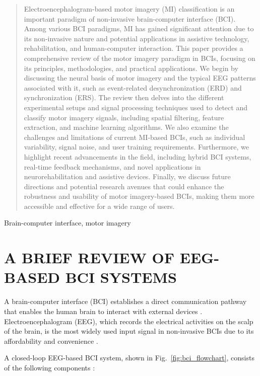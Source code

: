 \documentclass[journal,twocolumn]{IEEEtran}
\begin{document}
\begin{abstract}
Electroencephalogram-based motor imagery (MI) classification is an important paradigm of non-invasive brain-computer interface (BCI). Among various BCI paradigms, MI has gained significant attention due to its non-invasive nature and potential applications in assistive technology, rehabilitation, and human-computer interaction. This paper provides a comprehensive review of the motor imagery paradigm in BCIs, focusing on its principles, methodologies, and practical applications. We begin by discussing the neural basis of motor imagery and the typical EEG patterns associated with it, such as event-related desynchronization (ERD) and synchronization (ERS). The review then delves into the different experimental setups and signal processing techniques used to detect and classify motor imagery signals, including spatial filtering, feature extraction, and machine learning algorithms. We also examine the challenges and limitations of current MI-based BCIs, such as individual variability, signal noise, and user training requirements. Furthermore, we highlight recent advancements in the field, including hybrid BCI systems, real-time feedback mechanisms, and novel applications in neurorehabilitation and assistive devices. Finally, we discuss future directions and potential research avenues that could enhance the robustness and usability of motor imagery-based BCIs, making them more accessible and effective for a wide range of users.
\end{abstract}

\begin{IEEEkeywords}
Brain-computer interface, motor imagery
\end{IEEEkeywords}

\IEEEpeerreviewmaketitle

\section{A BRIEF REVIEW OF EEG-BASED BCI SYSTEMS} \cite{wu2020transfer}

A brain-computer interface (BCI) establishes a direct communication pathway that enables the human brain to interact with external devices \cite{graimann2010brain}. Electroencephalogram (EEG), which records the electrical activities on the scalp of the brain, is the most widely used input signal in non-invasive BCIs due to its affordability and convenience \cite{nicolas2012brain}.

A closed-loop EEG-based BCI system, shown in Fig.~\ref{fig:bci_flowchart}, consists of the following components \cite{wu2020transfer}:
\end{document}
